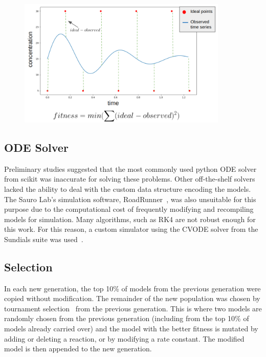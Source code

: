 \documentclass[12pt]{report}
\begin{document}
\begin{figure}
    \centering
    \includegraphics[width=10cm]{images/fitness.png}
    \label{fig:fitness}
\end{figure}

\subsection{ODE Solver}
Preliminary studies suggested that the most commonly used python ODE solver from scikit was inaccurate for solving these problems. Other off-the-shelf solvers lacked the ability to deal with the custom data structure encoding the models. The Sauro Lab's simulation software, RoadRunner~\cite{Somogyi2015}, was also unsuitable for this purpose due to the computational cost of frequently modifying and recompiling models for simulation. Many algorithms, such as RK4 are not robust enough for this work. For this reason, a custom simulator using the CVODE solver from the Sundials suite was used~\cite{hindmarsh2005sundials}. 

\subsection{Selection}
In each new generation, the top 10\% of models from the previous generation were copied without modification. The remainder of the new population was chosen by tournament selection~\cite{Miller1995} from the previous generation. This is where two models are randomly chosen from the previous generation (including from the top 10\% of models already carried over) and the model with the better fitness is mutated by adding or deleting a reaction, or by modifying a rate constant. The modified model is then appended to the new generation. 
\end{document}
